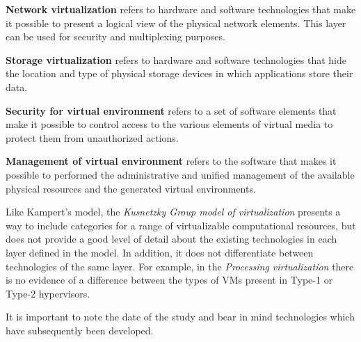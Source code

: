 	\textbf{Network virtualization} refers to hardware and software technologies that make it possible to present a logical view of the physical network elements. This layer can be used for security and multiplexing purposes.
		
	\textbf{Storage virtualization} refers to hardware and software technologies that hide the location and type of physical storage devices in which applications store their data.
		
	\textbf{Security for virtual environment} refers to a set of software elements that make it possible to control access to the various elements of virtual media to protect them from unauthorized actions.
		
	\textbf{Management of virtual environment} refers to the software that makes it possible to performed the administrative and unified management of the available physical resources and the generated virtual environments.

	Like Kampert's model, the \textit{Kusnetzky Group model of virtualization} presents a way to include categories for a range of virtualizable computational resources, but does not provide a good level of detail about the existing technologies in each layer defined in the model. In addition, it does not differentiate between technologies of the same layer. For example, in the \textit{Processing virtualization} there is no evidence of a difference between the types of VMs present in Type-1 or Type-2 hypervisors. 
	
	It is important to note the date of the study and bear in mind technologies which have subsequently been developed. 
